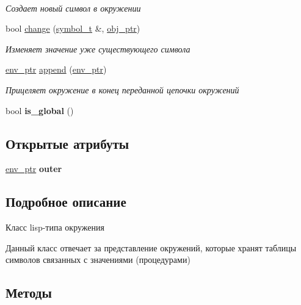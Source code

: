 \begin{DoxyCompactItemize}
$$\begin{DoxyCompactList}\small\item\em Создает новый символ в окружении \end{DoxyCompactList}\item 
bool \mbox{\hyperlink{classenvironment__t_a73cbdbc4b02e7efd863b5d4cbc3bc6c8}{change}} (\mbox{\hyperlink{lisp__types_8hpp_a543c62d3ca4ba3750602b9c6b11af1de}{symbol\+\_\+t}} \&, \mbox{\hyperlink{classmm__ptr}{obj\+\_\+ptr}})
\begin{DoxyCompactList}\small\item\em Изменяет значение уже существующего символа \end{DoxyCompactList}\item 
\mbox{\hyperlink{classmm__ptr}{env\+\_\+ptr}} \mbox{\hyperlink{classenvironment__t_a2b3db01d40e9b94f8234252768a5a396}{append}} (\mbox{\hyperlink{classmm__ptr}{env\+\_\+ptr}})
\begin{DoxyCompactList}\small\item\em Прицеляет окружение в конец переданной цепочки окружений \end{DoxyCompactList}\item 
\mbox{\label{classenvironment__t_af007eec97ac909cbb8c2e9cc2b94c436}} 
bool {\bfseries is\+\_\+global} ()
\end{DoxyCompactItemize}
\subsection*{Открытые атрибуты}
\begin{DoxyCompactItemize}
\item 
\mbox{\label{classenvironment__t_af987f6d3a0b7ab1ab2c488541aa6f6c9}} 
\mbox{\hyperlink{classmm__ptr}{env\+\_\+ptr}} {\bfseries outer}
\end{DoxyCompactItemize}


\subsection{Подробное описание}
Класс lisp-\/типа окружения 

Данный класс отвечает за представление окружений, которые хранят таблицы символов связанных с значениями (процедурами) 

\subsection{Методы}
\mbox{\label{classenvironment__t_ac45c20ebf992a8288b2f3fc80cc4ec7e}} 
